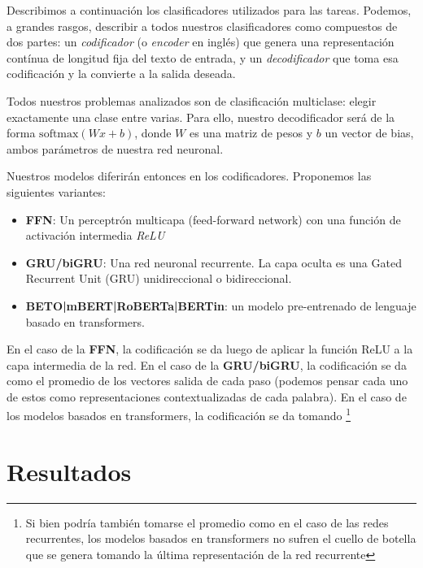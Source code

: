 Describimos a continuación los clasificadores utilizados para las tareas. Podemos, a grandes rasgos, describir a todos nuestros clasificadores como compuestos de dos partes: un \emph{codificador} (o \emph{encoder} en inglés) que genera una representación contínua de longitud fija del texto de entrada, y un \emph{decodificador} que toma esa codificación y la convierte a la salida deseada.

Todos nuestros problemas analizados son de clasificación multiclase: elegir exactamente una clase entre varias. Para ello, nuestro decodificador será de la forma $\text{softmax}(Wx + b)$, donde $W$ es una matriz de pesos y $b$ un vector de bias, ambos parámetros de nuestra red neuronal.

Nuestros modelos diferirán entonces en los codificadores. Proponemos las siguientes variantes:

\begin{itemize}
    \item \textbf{FFN}: Un perceptrón multicapa (feed-forward network) con una función de activación intermedia \emph{ReLU}
    \item \textbf{GRU/biGRU}: Una red neuronal recurrente. La capa oculta es una Gated Recurrent Unit (GRU) unidireccional o bidireccional.
    \item \textbf{BETO|mBERT|RoBERTa|BERTin}: un modelo pre-entrenado de lenguaje basado en transformers.
\end{itemize}

En el caso de la \textbf{FFN}, la codificación se da luego de aplicar la función ReLU a la capa intermedia de la red. En el caso de la \textbf{GRU/biGRU}, la codificación se da como el promedio de los vectores salida de cada paso (podemos pensar cada uno de estos como representaciones contextualizadas de cada palabra). En el caso de los modelos basados en transformers, la codificación se da tomando \footnote{Si bien podría también tomarse el promedio como en el caso de las redes recurrentes, los modelos basados en transformers no sufren el cuello de botella que se genera tomando la última representación de la red recurrente}


\section{Resultados}

